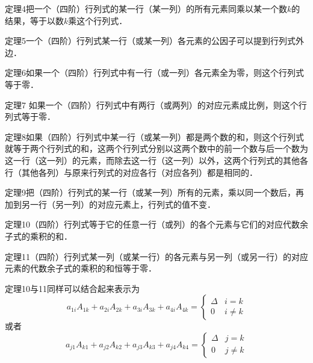 \begin{blk}
    {定理4}把一个（四阶）行列式的某一行（某一列）的所有元素同乘以某一个数$k$的结果，等于以数$k$乘这个行列式．
\end{blk}

\begin{blk}
    {定理5}一个（四阶）行列式某一行（或某一列）各元素的公因子可以提到行列式外边．
\end{blk}

\begin{blk}
    {定理6}如果一个（四阶）行列式中有一行（或一列）各元素全为零，则这个行列式等于零．
\end{blk}

\begin{blk}
    {定理7} 如果一个（四阶）行列式中有两行（或两列）的对应元素成比例，则这个行列式等于零．
\end{blk}

\begin{blk}
    {定理8}如果（四阶）行列式中某一行（或某一列）都是两个数的和，则这个行列式就等于两个行列式的和，这两个行列式分别以这两个数中的前一个数与后一个数为这一行（这一列）的元素，而除去这一行（这一列）以外，这两个行列式的其他各行（其他各列）与原来行列式的对应各行（对应各列）都是相同的．
\end{blk}

\begin{blk}
    {定理9}把（四阶）行列式的某一行（或某一列）所有的元素，乘以同一个数后，再加到另一行（另一列）的对应元素上，行列式的值不变．
\end{blk}

\begin{blk}
    {定理10}（四阶）行列式等于它的任意一行（或列）的各个元素与它们的对应代数余子式的乘积的和．
\end{blk}

\begin{blk}
    {定理11}（四阶）行列式某一列（或某一行）的各元素与另一列（或另一行）的对应元素的代数余子式的乘积的和恒等于零．
\end{blk}

定理10与11同样可以结合起来表示为
\[a_{1i}A_{1k}+a_{2i}A_{2k}+a_{3i}A_{3k}+a_{4i}A_{4k}=\begin{cases}
    \Delta&i=k \\ 0& i\ne k
\end{cases}\]
或者
\[a_{j1}A_{k1}+a_{j2}A_{k2}+a_{j3}A_{k3}+a_{j4}A_{k4}=\begin{cases}
    \Delta&j=k \\ 0& j\ne k
\end{cases}\]

